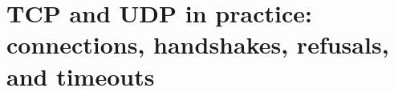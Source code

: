 \chapter{TCP and UDP in practice: connections, handshakes, refusals, and timeouts}
\label{ch:tcp-and-udp-in-practice-connections}

